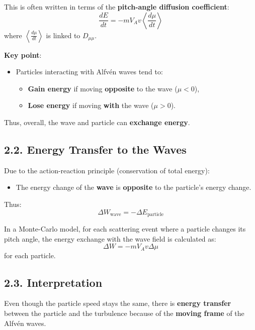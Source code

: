 This is often written in terms of the \textbf{pitch-angle diffusion coefficient}:
\begin{equation}
\frac{dE}{dt} = - m V_A v \left\langle \frac{d\mu}{dt} \right\rangle
\tag{1}
\end{equation}
where $\left\langle \frac{d\mu}{dt} \right\rangle$ is linked to $D_{\mu\mu}$.

\textbf{Key point}:
\begin{itemize}
    \item Particles interacting with Alfvén waves tend to:
    \begin{itemize}
        \item \textbf{Gain energy} if moving \textbf{opposite} to the wave ($\mu < 0$),
        \item \textbf{Lose energy} if moving \textbf{with} the wave ($\mu > 0$).
    \end{itemize}
\end{itemize}

Thus, overall, the wave and particle can \textbf{exchange energy}.

\subsection*{2.2. \textbf{Energy Transfer to the Waves}}

Due to the action-reaction principle (conservation of total energy):
\begin{itemize}
    \item The energy change of the \textbf{wave} is \textbf{opposite} to the particle’s energy change.
\end{itemize}

Thus:
\begin{equation}
\boxed{\Delta W_{\text{wave}} = - \Delta E_{\text{particle}}}
\tag{2}
\end{equation}

In a Monte-Carlo model, for each scattering event where a particle changes its pitch angle, the energy exchange with the wave field is calculated as:
\begin{equation}
\Delta W = - m V_A v \Delta \mu
\tag{3}
\end{equation}
for each particle.

\subsection*{2.3. \textbf{Interpretation}}

Even though the particle speed stays the same, there is \textbf{energy transfer} between the particle and the turbulence because of the \textbf{moving frame} of the Alfvén waves.

